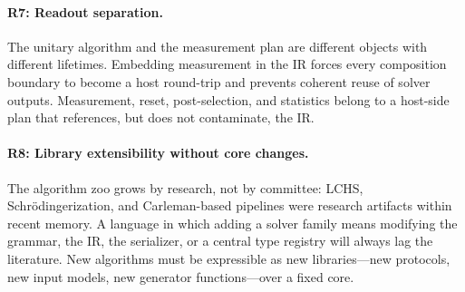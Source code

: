 \paragraph{R7: Readout separation.}
The unitary algorithm and the measurement plan are different objects with
different lifetimes.  Embedding measurement in the IR forces every
composition boundary to become a host round-trip and prevents coherent reuse
of solver outputs.  Measurement, reset, post-selection, and statistics belong
to a host-side plan that references, but does not contaminate, the IR.

\paragraph{R8: Library extensibility without core changes.}
The algorithm zoo grows by research, not by committee: LCHS, Schr\"odingerization,
and Carleman-based pipelines were research artifacts within recent memory.
A language in which adding a solver family means modifying the grammar, the
IR, the serializer, or a central type registry will always lag the
literature.  New algorithms must be expressible as new libraries---new
protocols, new input models, new generator functions---over a fixed core.

